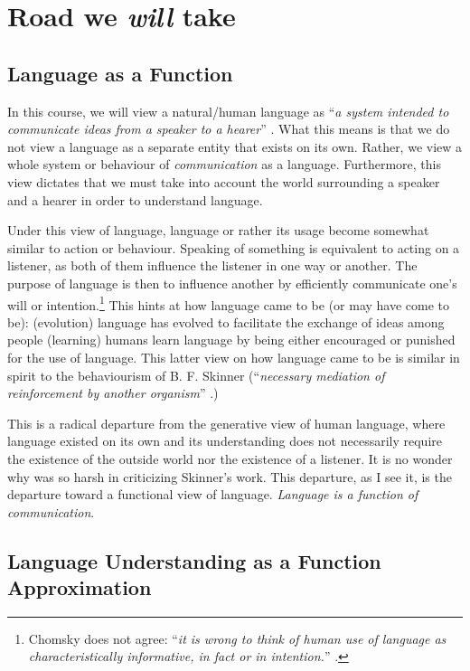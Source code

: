 \documentclass{report}
\begin{document}
\section{Road we \emph{will} take}
\label{sec:intro}

\subsection{Language as a Function}

In this course, we will view a natural/human language as ``\emph{a system
intended to communicate ideas from a speaker to a hearer}''
\citep{winograd1972understanding}. What this means is that we do not view a
language as a separate entity that exists on its own. Rather, we view a whole
system or behaviour of \emph{communication} as a language. Furthermore, this view
dictates that we must take into account the world surrounding a speaker and a
hearer in order to understand language.

Under this view of language, language or rather its usage become somewhat
similar to action or behaviour. Speaking of something is equivalent to acting on
a listener, as both of them influence the listener in one way or another. The
purpose of language is then to influence another by efficiently communicate
one's will or intention.\footnote{
    Chomsky does not agree: ``\emph{it is wrong to think of human use of language
    as characteristically informative, in fact or in intention.}''
    \citep{chomsky1968linguistic}.
} This hints at how language came to be (or may have come to be): (evolution)
language has evolved to facilitate the exchange of ideas among people (learning)
humans learn language by being either encouraged or punished for the use of
language. This latter view on how language came to be is similar in spirit to
the behaviourism of B. F. Skinner (``\emph{necessary mediation of reinforcement by
another organism}'' \citep{skinner2014verbal}.)

This is a radical departure from the generative view of human language, where
language existed on its own and its understanding does not necessarily require
the existence of the outside world nor the existence of a listener. It is no
wonder why \citet{chomsky1959review} was so harsh in criticizing Skinner's work.
This departure, as I see it, is the departure toward a functional view of
language. \emph{Language is a function of communication}. 

\subsection{Language Understanding as a Function Approximation}
\end{document}
